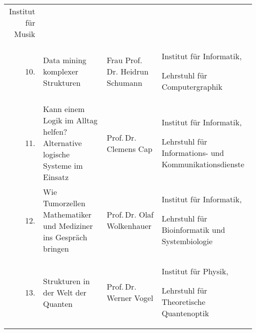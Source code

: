 \begin{longtable}{rXp{5cm}p{4cm}}
  Institut für Musik\\

  10. & Data mining komplexer Strukturen & Frau Prof.\,Dr. Heidrun Schumann &
  Institut für Informatik,

  Lehrstuhl für Computergraphik\\

  11. & Kann einem Logik im Alltag helfen? Alternative logische Systeme im
  Einsatz & Prof.\,Dr. Clemens Cap & Institut für Informatik,

  Lehrstuhl für Informations- und Kommunikationsdienste\\

  12. & Wie Tumorzellen Mathematiker und Mediziner ins Gespräch bringen &
  Prof.\,Dr. Olaf Wolkenhauer & Institut für Informatik,

  Lehrstuhl für Bioinformatik und Systembiologie\\

  13. & Strukturen in der Welt der Quanten & Prof.\,Dr. Werner Vogel & Institut
  für Physik,

  Lehrstuhl für Theoretische Quantenoptik\\
\end{longtable}

